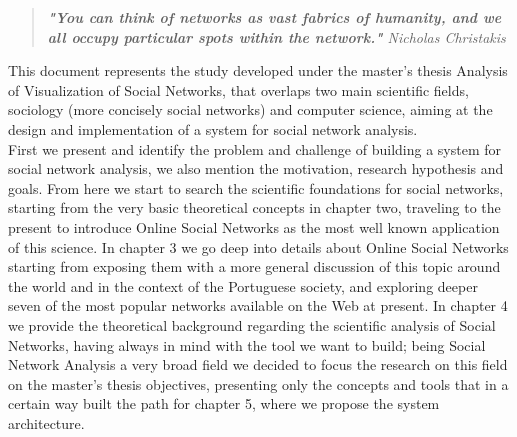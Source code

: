 
\begin{quote}
\textit{\textbf{"You can think of networks as vast fabrics of humanity, and we all occupy particular spots within the network."} Nicholas Christakis}
\end{quote}

This document represents the study developed under the master's thesis Analysis of Visualization of Social Networks, that overlaps
two main scientific fields, sociology (more concisely social networks) and computer science, aiming at the design and implementation of a system for social network analysis.\\

\indent First we present and identify the problem and challenge of building a system for social network analysis, we also mention the motivation, research hypothesis and goals. From here we start to search the scientific foundations for social networks, starting from the very basic theoretical concepts in chapter two, traveling to the present to introduce Online Social Networks as the most well known application of this science. In chapter 3 we go deep into details about Online Social Networks starting from exposing them with a more general discussion of this topic around the world and in the context of the Portuguese society, and exploring deeper seven of the most popular networks available on the Web at present. In chapter 4 we provide the theoretical background regarding the scientific analysis of Social Networks, having always in mind with the tool we want to build; being Social Network Analysis a very broad field we decided to focus the research on this field on the master's thesis objectives, presenting only the concepts and tools that in a certain way built the path for chapter 5, where we propose the system architecture.\\

